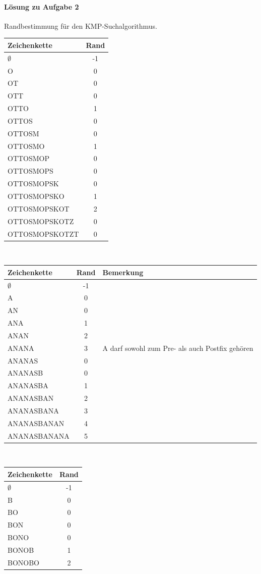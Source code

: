 \documentclass[11pt,a4paper]{scrartcl}
\begin{document}
\paragraph{Lösung zu Aufgabe 2}
\label{a2.2:lsg}
Randbestimmung für den KMP-Suchalgorithmus. \\
\begin{center}
\begin{tabular}{|l|c|}
\hline
Zeichenkette & Rand \\
\hline
$\emptyset$ & -1 \\
O & 0 \\
OT & 0 \\
OTT & 0 \\
OTTO & 1 \\
OTTOS & 0 \\
OTTOSM & 0 \\
OTTOSMO & 1 \\
OTTOSMOP & 0 \\
OTTOSMOPS & 0 \\
OTTOSMOPSK & 0 \\
OTTOSMOPSKO & 1 \\
OTTOSMOPSKOT & 2 \\
OTTOSMOPSKOTZ & 0 \\
OTTOSMOPSKOTZT & 0 \\
\hline
\end{tabular} \\
\begin{tabular}{|l|c|l|}
\hline
Zeichenkette & Rand & Bemerkung \\
\hline
$\emptyset$ & -1 &\\
A & 0 &\\
AN & 0 &\\
ANA & 1 &\\
ANAN & 2 &\\
ANANA & 3 & A darf sowohl zum Pre- als auch Postfix gehören  \\
ANANAS & 0 &\\
ANANASB & 0 &\\
ANANASBA & 1 &\\
ANANASBAN & 2 &\\
ANANASBANA & 3 &\\
ANANASBANAN & 4 &\\
ANANASBANANA & 5 &\\
\hline
\end{tabular} \\
\begin{tabular}{|l|c|}
\hline
Zeichenkette & Rand \\
\hline
$\emptyset$ & -1 \\
B & 0 \\
BO & 0 \\
BON & 0 \\
BONO & 0 \\
BONOB & 1 \\
BONOBO & 2 \\
\hline
\end{tabular} \\
\end{center}
\end{document}
